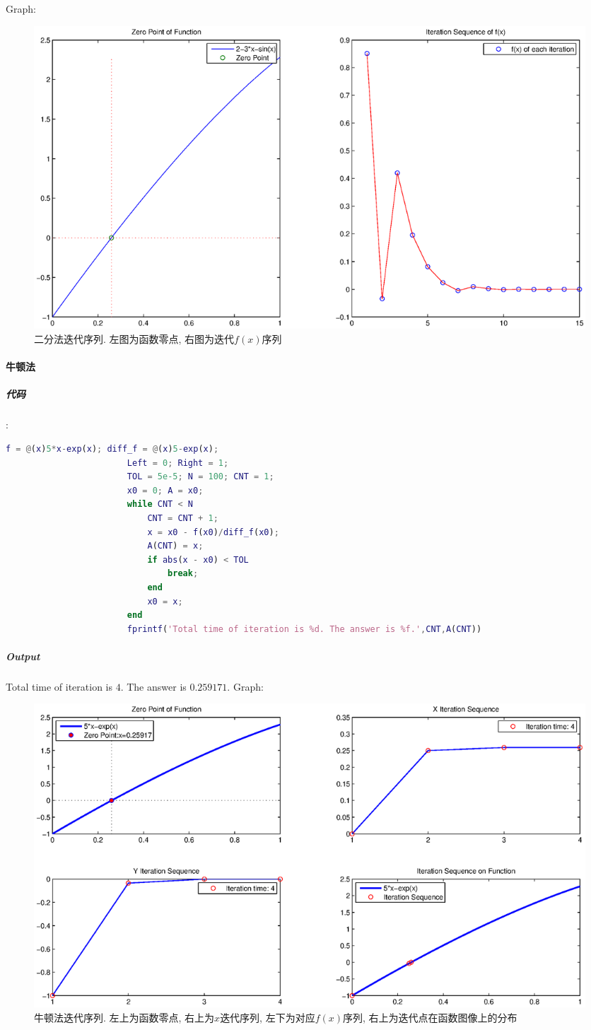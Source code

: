 \documentclass{article}
\begin{document}
\begin{CJK*}{UTF8}{song}
					Graph:
					
					\begin{figure}[H]
						\centering
						\includegraphics[width=1.0\textwidth]{../chapter2_4_1.eps}
						\caption{二分法迭代序列. 左图为函数零点, 右图为迭代$f\left(x\right)$序列}
						\label{img_chapter2_4_1}
					\end{figure}
			\paragraph{牛顿法}
				
				\subparagraph{代码}
				:\newline
					\begin{lstlisting}[language=Matlab]
						f = @(x)5*x-exp(x); diff_f = @(x)5-exp(x);
						Left = 0; Right = 1;                      
						TOL = 5e-5; N = 100; CNT = 1;
						x0 = 0; A = x0;
						while CNT < N
							CNT = CNT + 1;
							x = x0 - f(x0)/diff_f(x0);
							A(CNT) = x;
							if abs(x - x0) < TOL
								break;
							end
							x0 = x;
						end
						fprintf('Total time of iteration is %d. The answer is %f.',CNT,A(CNT))
					\end{lstlisting}
				\subparagraph{Output}
					Total time of iteration is $4$. The answer is $0.259171$.
					Graph:
					\begin{figure}[H]
						\centering
						\includegraphics[width=1.0\textwidth]{../chapter2_4_2.eps}
						\caption{牛顿法迭代序列. 左上为函数零点, 右上为$x$迭代序列, 左下为对应$f\left(x\right)$序列, 右上为迭代点在函数图像上的分布}
						\label{img_chapter2_4_2}
					\end{figure}					

\end{CJK*}
\end{document}
